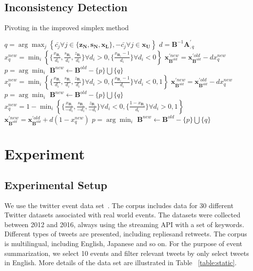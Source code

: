 \documentclass{llncs}
\begin{document}
\subsection{Inconsistency Detection}
\begin{algorithm}[htbp]
\caption{Pivoting in the improved simplex method}
    $q = \arg\max_{j} \left\{\bar{c_j} \forall j\in\{\mathbf{z_N}, \mathbf{s_N}, \mathbf{x_L}  \},-\bar{c_j} \forall j\in\mathbf{x_U}  \right\}$\;
    $d = \mathbf{B}^{-1}\mathbf{A}_{,q}^{'}$\;
    {
        $x_q^{new} = \min_i \left\{\{\frac{x_{\mathbf{B}_{i}}}{d_i}, \frac{s_{\mathbf{B}_{i}}}{d_i}, \frac{z_{\mathbf{B}_{i}}}{d_i}\} \forall d_i>0,\{\frac{x_{\mathbf{B}_{i}}-1}{d_i}\} \forall d_i<0\right\}$\;
        $\mathbf{x}_{\mathbf{B}^{old}}^{'new} = \mathbf{x}_{\mathbf{B}^{old}}^{'old} - dx_q^{new}$\;
        $p=\arg\min_{i}$\;
        $\mathbf{B}^{new} \leftarrow \mathbf{B}^{old} - \{p\} \bigcup \{q\}$\;
    }
    {
        $x_q^{new} = \min_i \left\{\{\frac{x_{\mathbf{B}_{i}}}{d_i}, \frac{s_{\mathbf{B}_{i}}}{d_i}, \frac{z_{\mathbf{B}_{i}}}{d_i}\} \forall d_i>0, \{\frac{x_{\mathbf{B}_{i}}-1}{d_i}\} \forall d_i<0, 1 \right\}$\;
        $\mathbf{x}_{\mathbf{B}^{old}}^{'new} = \mathbf{x}_{\mathbf{B}^{old}}^{'old} - dx_q^{new}$\; 
        {
            $p=\arg\min_{i}$\;
            $\mathbf{B}^{new} \leftarrow \mathbf{B}^{old} - \{p\} \bigcup \{q\}$\;
        }
    }
    {
        $x_q^{new} = 1 - \min_i \left\{\{\frac{x_{\mathbf{B}_{i}}}{-d_i}, \frac{s_{\mathbf{B}_{i}}}{-d_i}, \frac{z_{\mathbf{B}_{i}}}{-d_i}\} \forall d_i<0, \{\frac{1-x_{\mathbf{B}_{i}}}{d_i}\} \forall d_i>0, 1 \right\}$\;
        $\mathbf{x}_{\mathbf{B}^{old}}^{'new} = \mathbf{x}_{\mathbf{B}^{old}}^{'old} + d(1-x_q^{new})$\;
        {
            $p=\arg\min_{i}$\;
            $\mathbf{B}^{new} \leftarrow \mathbf{B}^{old} - \{p\} \bigcup \{q\}$\;
        }
    }

\end{algorithm}




\section{Experiment}\label{sec:experiment}
\subsection{Experimental Setup}
We use the twitter event data set~\cite{}. The corpus includes data for 30 different Twitter datasets associated with real world events. The datasets were collected between 2012 and 2016, always using the streaming API with a set of keywords. Different types of tweets are presented, including repliesand retweets. The corpus is multilingual, including English, Japanese and so on. For the purpose of event summarization, we select 10 events and filter relevant tweets by only select tweets in English. More details of the data set are illustrated in Table ~\ref{table:static}.
\end{document}
